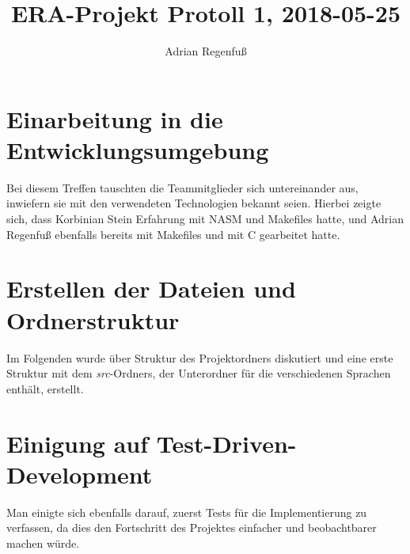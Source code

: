 \documentclass{article}
\title{ERA-Projekt Protoll 1, 2018-05-25}
\author{Adrian Regenfuß}
\begin{document}
\maketitle

\section{Einarbeitung in die Entwicklungsumgebung}

Bei diesem Treffen tauschten die Teammitglieder sich untereinander aus,
inwiefern sie mit den verwendeten Technologien bekannt seien. Hierbei
zeigte sich, dass Korbinian Stein Erfahrung mit NASM und Makefiles
hatte, und Adrian Regenfuß ebenfalls bereits mit Makefiles und mit C
gearbeitet hatte.

\section{Erstellen der Dateien und Ordnerstruktur}

Im Folgenden wurde über Struktur des Projektordners diskutiert und
eine erste Struktur mit dem \emph{src}-Ordners, der Unterordner für
die verschiedenen Sprachen enthält, erstellt.

\section{Einigung auf Test-Driven-Development}

Man einigte sich ebenfalls darauf, zuerst Tests für die Implementierung
zu verfassen, da dies den Fortschritt des Projektes einfacher und beobachtbarer
machen würde.
\end{document}
